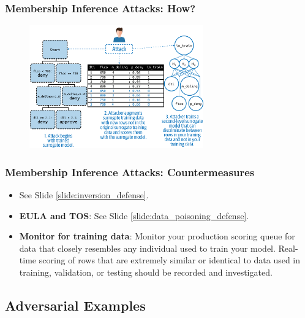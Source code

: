 \documentclass[11pt,
               aspectratio=169,
               hyperref={colorlinks}
               ]{beamer}
\begin{document}
			\begin{frame}[label={slide:membership}]
		
				\frametitle{Membership Inference Attacks: \textbf{How?}}		
			
				\begin{figure}[htb]
					\begin{center}
						\includegraphics[height=150pt]{../img/membership_inference.png}
					\end{center}
				\end{figure}	


			\end{frame}
			
			\begin{frame}
		
				\frametitle{Membership Inference Attacks: \textbf{Countermeasures}}		
			
				\begin{itemize}
					\Large
				\item See Slide \ref{slide:inversion_defense}.
				\item \textbf{EULA and TOS}: See Slide \ref{slide:data_poisoning_defense}.
				\item \textbf{Monitor for training data}: Monitor your production scoring queue for data that closely resembles any individual used to train your model. Real-time scoring of rows that are extremely similar or identical to data used in training, validation, or testing should be recorded and investigated.
				\end{itemize}

			\end{frame}
	
		\subsection{Adversarial Examples}
	
\end{document}
